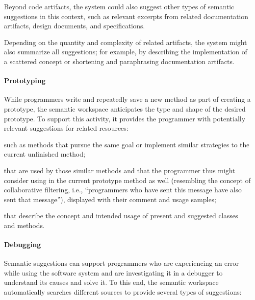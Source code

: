 	\noindent
	Beyond code artifacts, the system could also suggest other types of semantic suggestions in this context, such as relevant excerpts from related documentation artifacts, design documents, and specifications.

	Depending on the quantity and complexity of related artifacts, the system might also summarize all suggestions; for example, by describing the implementation of a scattered concept or shortening and paraphrasing documentation artifacts.

	\paragraph{Prototyping}
	While programmers write and repeatedly save a new method as part of creating a prototype, the semantic workspace anticipates the type and shape of the desired prototype.
	To support this activity, it provides the programmer with potentially relevant suggestions for related resources:

	\begin{description}[noextralabelsep]
		\item[similar methods,] such as methods that pursue the same goal or implement similar strategies to the current unfinished method;
		\item[correlated methods and classes] that are used by those similar methods and that the programmer thus might consider using in the current prototype method as well (resembling the concept of collaborative filtering, i.e., ``programmers who have sent this message have also sent that message''), displayed with their comment and usage samples;
		\item[documentation artifacts] that describe the concept and intended usage of present and suggested classes and methods.
	\end{description}

	\paragraph{Debugging}
	Semantic suggestions can support programmers who are experiencing an error while using the software system and are investigating it in a debugger to understand its causes and solve it.
	To this end, the semantic workspace automatically searches different sources to provide several types of suggestions:

